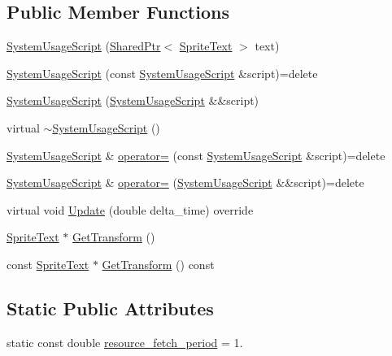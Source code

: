 \subsection*{Public Member Functions}
\begin{DoxyCompactItemize}
\item 
\hyperlink{classmage_1_1_system_usage_script_a430d87647bdc6e407838863b1fcb750d}{System\+Usage\+Script} (\hyperlink{namespacemage_a1e01ae66713838a7a67d30e44c67703e}{Shared\+Ptr}$<$ \hyperlink{classmage_1_1_sprite_text}{Sprite\+Text} $>$ text)
\item 
\hyperlink{classmage_1_1_system_usage_script_a3fccc6dda27ede785fb9c45360e53bb0}{System\+Usage\+Script} (const \hyperlink{classmage_1_1_system_usage_script}{System\+Usage\+Script} \&script)=delete
\item 
\hyperlink{classmage_1_1_system_usage_script_a013e7c6510442421d74bffa3b2f810fe}{System\+Usage\+Script} (\hyperlink{classmage_1_1_system_usage_script}{System\+Usage\+Script} \&\&script)
\item 
virtual \hyperlink{classmage_1_1_system_usage_script_ac4c71b831e5cd5d6a5db8783150b76cc}{$\sim$\+System\+Usage\+Script} ()
\item 
\hyperlink{classmage_1_1_system_usage_script}{System\+Usage\+Script} \& \hyperlink{classmage_1_1_system_usage_script_a3ca814599a30991f3e6068cec2b876df}{operator=} (const \hyperlink{classmage_1_1_system_usage_script}{System\+Usage\+Script} \&script)=delete
\item 
\hyperlink{classmage_1_1_system_usage_script}{System\+Usage\+Script} \& \hyperlink{classmage_1_1_system_usage_script_ad9c1a2f19c6d79adbd32789e479e1427}{operator=} (\hyperlink{classmage_1_1_system_usage_script}{System\+Usage\+Script} \&\&script)=delete
\item 
virtual void \hyperlink{classmage_1_1_system_usage_script_af7189c6e81dabfe077710ed9f3c7cd09}{Update} (double delta\+\_\+time) override
\item 
\hyperlink{classmage_1_1_sprite_text}{Sprite\+Text} $\ast$ \hyperlink{classmage_1_1_system_usage_script_ad8291c309495bd06cd6878814bc422c9}{Get\+Transform} ()
\item 
const \hyperlink{classmage_1_1_sprite_text}{Sprite\+Text} $\ast$ \hyperlink{classmage_1_1_system_usage_script_ac6f33a63937537375821d7780859a83e}{Get\+Transform} () const
\end{DoxyCompactItemize}
\subsection*{Static Public Attributes}
\begin{DoxyCompactItemize}
\item 
static const double \hyperlink{classmage_1_1_system_usage_script_a98a30b1da6b9b87237e3509aed961162}{resource\+\_\+fetch\+\_\+period} = 1.
\end{DoxyCompactItemize}
